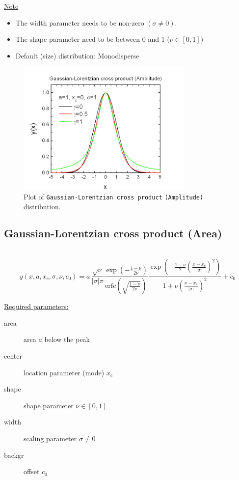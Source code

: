 \underline{Note}
\begin{itemize}
  \item The width parameter needs to be non-zero $(\sigma\neq 0)$.
  \item The shape parameter need to be between 0 and 1 ($\nu\in [0,1]$)
  \item Default (size) distribution: Monodisperse
\end{itemize}
\begin{figure}[htb]
\begin{center}
\includegraphics[width=0.768\textwidth]{GaussianLorentzianCrossProductAmplitude.png}
\end{center}
\caption{Plot of \texttt{Gaussian-Lorentzian cross product} \texttt{(Amplitude)} distribution.}
\label{fig:GaussianLorentzianCrossProductAmplitude}
\end{figure}

\clearpage

\subsection{Gaussian-Lorentzian cross product (Area)} ~\\
\label{sec:GaussianLorentzianCrossProductArea}
\begin{equation}
y(x,a,x_c,\sigma,\nu,c_0) = a\,
\frac{\sqrt{\nu}}{|\sigma|\pi}\frac{\exp\left(-\frac{1-\nu}{2\nu}\right)}{\mbox{erfc}\left(\sqrt{\frac{1-\nu}{2\nu}}\right)}
\frac{\exp\left(-\frac{1-\nu}{2}\left(\frac{x-x_c}{|\sigma|}\right)^2\right)}{1+\nu\left(\frac{x-x_c}{|\sigma|}\right)^2}
+c_0
\end{equation}

\vspace{5mm}

\underline{Required parameters:}
\begin{description}
    \item[area] area $a$ below the peak
    \item[center] location parameter (mode) $x_c$
    \item[shape] shape parameter $\nu\in [0,1]$
    \item[width] scaling parameter $\sigma \neq 0$
    \item[backgr] offset $c_0$
\end{description}


